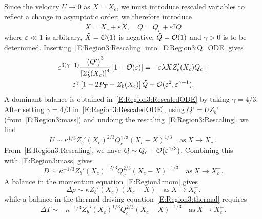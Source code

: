 \documentclass{article}
\begin{document}
Since the velocity $U \to 0$ as $X = X_c$, we must introduce rescaled variables to reflect a change in asymptotic order; we therefore introduce
\begin{equation}\label{E:Region3:Rescaling}
X = X_c + \varepsilon \tilde{X}, \quad Q = Q_c + \varepsilon^\gamma \tilde{Q}
\end{equation}
where $\varepsilon \ll 1$ is arbitrary, $\tilde{X} =\mathcal{O}(1)$ is negative, $\tilde{Q} = \mathcal{O}(1)$ and $\gamma >0$ is to be determined. Inserting~\eqref{E:Region3:Rescaling} into~\eqref{E:Region3:Q_ODE} gives
\begin{multline}\label{E:Region3:RescaledODE}
\varepsilon^{3(\gamma - 1)}\frac{\left(\tilde{Q'}\right)^3}{\left[Z_b'(X_c)\right]^4}\left[1 + \mathcal{O}(\varepsilon) \right]= -\varepsilon\lambda\tilde{X}Z_b'(X_c)Q_c + \\ \varepsilon^\gamma \left[1 - 2\textit{P}_T - Z_b(X_c)\right] \tilde{Q} + \mathcal{O}(\varepsilon^2, \varepsilon^{\gamma + 1}).
\end{multline}
A dominant balance is obtained in~\eqref{E:Region3:RescaledODE} by taking $\gamma = 4/3$. After setting $\gamma = 4/3$ in~\eqref{E:Region3:RescaledODE}, using $Q' = U Z_b'$ (from~\eqref{E:Region3:mass}) and undoing the rescaling~\eqref{E:Region3:Rescaling}, we find 
\begin{equation}\label{E:Region3:U_asym}
U \sim \kappa^{1/3} Z_b'(X_c)^{2/3} Q_c^{1/3}(X_c - X)^{1/3} \quad \text{as}~X \to X_c^-.
\end{equation}
From~\eqref{E:Region3:Rescaling}, we have $Q \sim Q_c + \mathcal{O}(\varepsilon^{4/3})$. Combining this with~\eqref{E:Region3:mass} gives
\begin{equation}\label{E:Region3:D_asym}
D \sim \kappa^{-1/3} Z_b'(X_c)^{-2/3} Q_c^{2/3}(X_c - X)^{-1/3} \quad \text{as}~X \to X_c^-.
\end{equation}
A balance in the momentum equation~\eqref{E:Region3:mom} gives
\begin{equation}\label{E:Region3:drho_asym}
\Delta \rho \sim  \kappa Z_b'(X_c) (X_c - X)\quad \text{as}~X \to X_c^-.
\end{equation}
while a balance in the thermal driving equation~\eqref{E:Region3:thermal} requires
\begin{equation}\label{E:Region3:dT_asym}
 \Delta T \sim -\kappa^{-1/3} Z_b'(X_c)^{1/3} Q_c^{2/3}(X_c - X)^{-1/3} \quad \text{as}~X \to X_c^-.
 \end{equation}
\end{document}
